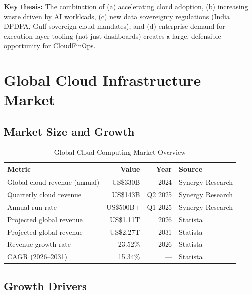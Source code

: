 \documentclass[a4paper,11pt]{article}
\begin{document}
\textbf{Key thesis:} The combination of (a) accelerating cloud adoption, (b) increasing waste driven by AI workloads, (c) new data sovereignty regulations (India DPDPA, Gulf sovereign-cloud mandates), and (d) enterprise demand for execution-layer tooling (not just dashboards) creates a large, defensible opportunity for CloudFinOps.

\section{Global Cloud Infrastructure Market}

\subsection{Market Size and Growth}

\begin{table}[H]
\centering
\begin{tabularx}{\textwidth}{Xrrl}
\toprule
\textbf{Metric} & \textbf{Value} & \textbf{Year} & \textbf{Source} \\
\midrule
Global cloud revenue (annual) & US\$330B & 2024 & Synergy Research \\
Quarterly cloud revenue & US\$143B & Q2 2025 & Synergy Research \\
Annual run rate & US\$500B+ & Q1 2025 & Synergy Research \\
Projected global revenue & US\$1.11T & 2026 & Statista \\
Projected global revenue & US\$2.27T & 2031 & Statista \\
Revenue growth rate & 23.52\% & 2026 & Statista \\
CAGR (2026--2031) & 15.34\% & --- & Statista \\
\bottomrule
\end{tabularx}
\caption{Global Cloud Computing Market Overview}
\end{table}

\subsection{Growth Drivers}
\end{document}
